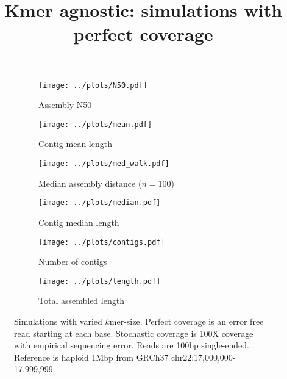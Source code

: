 \documentclass{article}
\title{Kmer agnostic: simulations with perfect coverage}
\begin{document}
\begin{figure}[ht]
\begin{subfigure}{.5\textwidth}
  \centering
  \caption{Assembly N50}
  \texttt{[image: ../plots/N50.pdf]}
\end{subfigure}
\begin{subfigure}{.5\textwidth}
  \centering
  \caption{Contig mean length}
  \texttt{[image: ../plots/mean.pdf]}
\end{subfigure}

\begin{subfigure}{.5\textwidth}
  \centering
  \caption{Median assembly distance ($n=100$)}
  \texttt{[image: ../plots/med\_walk.pdf]}
\end{subfigure}
\begin{subfigure}{.5\textwidth}
  \centering
  \caption{Contig median length}
  \texttt{[image: ../plots/median.pdf]}
\end{subfigure}

\begin{subfigure}{.5\textwidth}
  \centering
  \caption{Number of contigs}
  \texttt{[image: ../plots/contigs.pdf]}
\end{subfigure}
\begin{subfigure}{.5\textwidth}
  \centering
  \caption{Total assembled length}
  \texttt{[image: ../plots/length.pdf]}
\end{subfigure}
\caption{Simulations with varied $k$mer-size. Perfect coverage is an error free read starting at each base. Stochastic coverage is 100X coverage with empirical sequencing error. Reads are 100bp single-ended. Reference is haploid 1Mbp from GRCh37 chr22:17,000,000-17,999,999.}
\label{fig:kmer_agnostic}
\end{figure}
\end{document}
